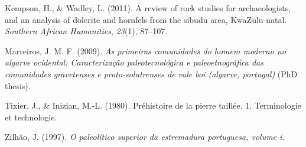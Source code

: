 \documentclass[12pt,twoside]{reedthesis}
\begin{document}
\leavevmode\hypertarget{ref-kempson2011}{}%
Kempson, H., \& Wadley, L. (2011). A review of rock studies for archaeologists, and an analysis of dolerite and hornfels from the sibudu area, KwaZulu-natal. \emph{Southern African Humanities}, \emph{23}(1), 87--107.

\leavevmode\hypertarget{ref-marreiros2009}{}%
Marreiros, J. M. F. (2009). \emph{As primeiras comunidades do homem moderno no algarve ocidental: Caracterização paleotecnológica e paleoetnográfica das comunidades gravetenses e proto-solutrenses de vale boi (algarve, portugal)} (PhD thesis).

\leavevmode\hypertarget{ref-tixier1980}{}%
Tixier, J., \& Inizian, M.-L. (1980). Préhistoire de la pierre taillée. 1. Terminologie et technologie.

\leavevmode\hypertarget{ref-zilhao1997}{}%
Zilhão, J. (1997). \emph{O paleolítico superior da estremadura portuguesa, volume i}.


\end{document}

